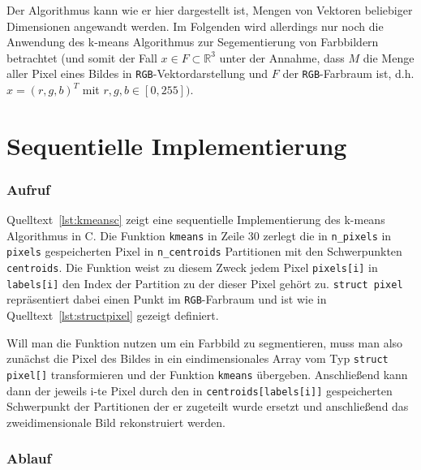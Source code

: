 \documentclass[ngerman, cd=lightcolor, cdmath=false]{tudscrreprt}
\begin{document}
Der Algorithmus kann wie er hier dargestellt ist, Mengen von Vektoren beliebiger
Dimensionen angewandt werden. Im Folgenden wird allerdings nur noch die Anwendung
des k-means Algorithmus zur Segementierung von Farbbildern betrachtet (und
somit der Fall $x \in F \subset \mathbb{R}^3$ unter der Annahme, dass $M$ die
Menge aller Pixel eines Bildes in \texttt{RGB}-Vektordarstellung und $F$ der
\texttt{RGB}-Farbraum ist, d.h. $x = (r, g, b)^T$ mit $r, g, b \in [0,
255])$.

\section{Sequentielle Implementierung}

\subsubsection{Aufruf}

Quelltext~\ref{lst:kmeansc} zeigt eine sequentielle Implementierung des k-means
Algorithmus in C. Die Funktion \texttt{kmeans} in Zeile 30 zerlegt die in
\texttt{n\_pixels} in \texttt{pixels} gespeicherten Pixel in
\texttt{n\_centroids} Partitionen mit den Schwerpunkten \texttt{centroids}. Die
Funktion weist zu diesem Zweck jedem Pixel \texttt{pixels[i]} in
\texttt{labels[i]} den Index der Partition zu der dieser Pixel gehört zu.
\texttt{struct pixel} repräsentiert dabei einen Punkt im \texttt{RGB}-Farbraum
und ist wie in Quelltext~\ref{lst:structpixel} gezeigt definiert.



Will man die Funktion nutzen um ein Farbbild zu segmentieren, muss man also
zunächst die Pixel des Bildes in ein eindimensionales Array vom Typ
\texttt{struct pixel[]} transformieren und der Funktion \texttt{kmeans}
übergeben. Anschließend kann dann der jeweils i-te Pixel durch den in
\texttt{centroids[labels[i]]} gespeicherten Schwerpunkt der Partitionen der er
zugeteilt wurde ersetzt und anschließend das zweidimensionale Bild
rekonstruiert werden.

\subsubsection{Ablauf}
\end{document}
